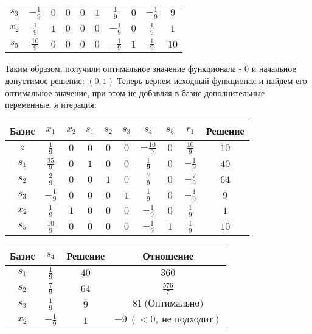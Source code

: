 \documentclass{article}%
\begin{document}
\begin{flushleft}
\begin{tabular}{|c|cccccccc|c|}
$s_{3}$&$-\frac{1}{9}$&$0$&$0$&$0$&$1$&$\frac{1}{9}$&$0$&$-\frac{1}{9}$&$9$\\%
$x_{2}$&$\frac{1}{9}$&$1$&$0$&$0$&$0$&$-\frac{1}{9}$&$0$&$\frac{1}{9}$&$1$\\%
$s_{5}$&$\frac{10}{9}$&$0$&$0$&$0$&$0$&$-\frac{1}{9}$&$1$&$\frac{1}{9}$&$10$\\%
\hline%
\end{tabular}%
\newline%
\newline%
Таким образом, получили оптимальное значение функционала {-} 0 и начальное допустимое решение: %
$(0, 1)$%
\newline%
Теперь вернем исходный функционал и найдем его оптимальное значение, при этом не добавляя в базис дополнительные переменные.%
я итерация: %
\newline%
\newline%
\renewcommand{\arraystretch}{1.3}%
\begin{tabular}{|c|cccccccc|c|}%
\hline%
Базис&$x_{1}$&$x_{2}$&$s_{1}$&$s_{2}$&$s_{3}$&$s_{4}$&$s_{5}$&$r_{1}$&Решение\\%
\hline%
$z$&$\frac{1}{9}$&$0$&$0$&$0$&$0$&$-\frac{10}{9}$&$0$&$\frac{10}{9}$&$10$\\%
\hline%
$s_{1}$&$\frac{35}{9}$&$0$&$1$&$0$&$0$&$\frac{1}{9}$&$0$&$-\frac{1}{9}$&$40$\\%
$s_{2}$&$\frac{2}{9}$&$0$&$0$&$1$&$0$&$\frac{7}{9}$&$0$&$-\frac{7}{9}$&$64$\\%
$s_{3}$&$-\frac{1}{9}$&$0$&$0$&$0$&$1$&$\frac{1}{9}$&$0$&$-\frac{1}{9}$&$9$\\%
$x_{2}$&$\frac{1}{9}$&$1$&$0$&$0$&$0$&$-\frac{1}{9}$&$0$&$\frac{1}{9}$&$1$\\%
$s_{5}$&$\frac{10}{9}$&$0$&$0$&$0$&$0$&$-\frac{1}{9}$&$1$&$\frac{1}{9}$&$10$\\%
\hline%
\end{tabular}%
\newline%
\newline%
\newline%
\begin{tabular}{|cccc|}%
\hline%
Базис&$s_{4}$&Решение&Отношение\\%
\hline%
$s_{1}$&$\frac{1}{9}$&$40$&$360$\\%
$s_{2}$&$\frac{7}{9}$&$64$&$\frac{576}{7}$\\%
$s_{3}$&$\frac{1}{9}$&$9$&$81\: \text{(Оптимально)}$\\%
$x_{2}$&$-\frac{1}{9}$&$1$&$-9\: (< 0, \: \text{не подходит})$\\%

\end{tabular}
\end{flushleft}
\end{document}
